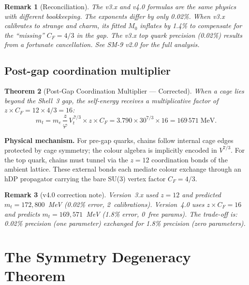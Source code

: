 \documentclass[11pt,letterpaper]{article}
\newtheorem{theorem}{Theorem}[section]
\newtheorem{remark}[theorem]{Remark}
\newcommand{\phig}{\varphi}
\begin{document}
\begin{remark}[Reconciliation]
The v3.x and v4.0 formulas are the same physics with different
bookkeeping.  The exponents differ by only 0.02\%.  When v3.x
calibrates to strange and charm, its fitted $M_0$ inflates by 1.4\%
to compensate for the ``missing'' $C_F = 4/3$ in the gap.  The v3.x
top quark precision (0.02\%) results from a fortunate cancellation.
See SM-9 v2.0 for the full analysis.
\end{remark}

\subsection{Post-gap coordination multiplier}
\label{sec:top-boost}

\begin{theorem}[Post-Gap Coordination Multiplier --- Corrected]
\label{thm:postgap}
When a cage lies beyond the Shell~3 gap, the self-energy receives
a multiplicative factor of $z \times C_F = 12 \times 4/3 = 16$:
\begin{equation}
m_t = m_e \,\frac{z}{\phig}\, V_t^{\,7/3} \times z \times C_F
    = 3.790 \times 30^{7/3} \times 16
    = 169\,571\;\text{MeV}.
\label{eq:top_v4}
\end{equation}
\end{theorem}

\noindent\textbf{Physical mechanism.}
For pre-gap quarks, chains follow internal cage edges protected by
cage symmetry; the colour algebra is implicitly encoded in
$V^{7/3}$.  For the top quark, chains must tunnel via the $z = 12$
coordination bonds of the ambient lattice.  These external bonds
each mediate colour exchange through an hDP propagator carrying the
bare SU(3) vertex factor $C_F = 4/3$.

\begin{remark}[v4.0 correction note]
Version~3.x used $z = 12$ and predicted $m_t = 172{,}800$~MeV
(0.02\% error, 2~calibrations).  Version~4.0 uses $z \times C_F = 16$
and predicts $m_t = 169{,}571$~MeV (1.8\% error, 0~free params).
The trade-off is: 0.02\% precision (one parameter) exchanged for
1.8\% precision (zero parameters).
\end{remark}

\section{The Symmetry Degeneracy Theorem}
\label{sec:degeneracy}
\end{document}
